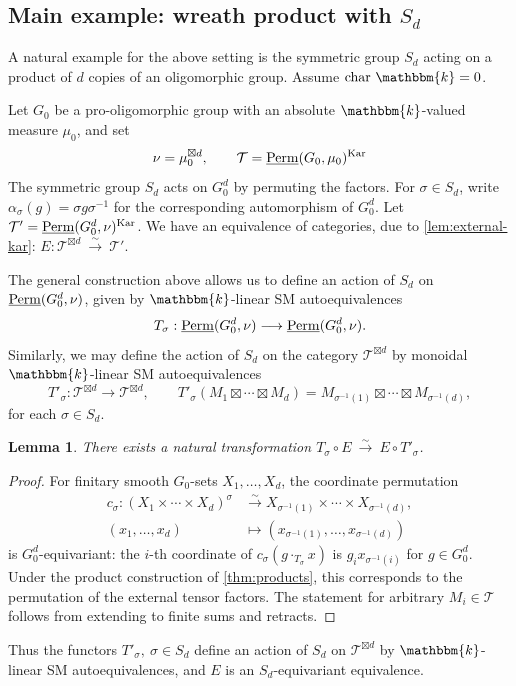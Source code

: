 \documentclass[11pt,a4paper]{amsart}
\theoremstyle{plain}%
\newtheorem{lemma}{Lemma}[subsection]
\theoremstyle{definition}
\theoremstyle{remark}
\newcommand{\Perm}{\underline{{\rm Perm}}}
\newcommand{\kk}{\mathbbm{k}}
\newcommand{\Kar}{\mathrm{Kar}}
\begin{document}
\subsection{Main example: wreath product with \texorpdfstring{$S_d$}{the symmetric group}}
    A natural example for the above setting is the symmetric group $S_d$ acting on a product of $d$ copies of an oligomorphic group. Assume $\mathrm{char} ~\kk=0$.
    
 Let $G_0$ be a pro-oligomorphic group with an absolute $\kk$-valued measure $\mu_0$, and set
\[
\nu=\mu_0^{\boxtimes d},\qquad \mathcal T =\Perm(G_0,\mu_0)^{\Kar}
\]
The symmetric group $S_d$ acts on $G_0^d$ by permuting the factors. For $\sigma\in S_d$, write $\alpha_\sigma(g)=\sigma g\sigma^{-1}$ for the corresponding automorphism of $G_0^d$.
 Let $\mathcal T'=\Perm(G_0^d,\nu)^{\Kar}$. We have an equivalence of categories, due to \cref{lem:external-kar}: $
E:\mathcal T^{\boxtimes d}~\xrightarrow{\sim} ~  \mathcal T'
$.

The general construction above allows us to define an action of $S_d$ on $\Perm(G_0^d,\nu)$, given by $\kk$-linear SM autoequivalences
\[
 T_\sigma:\Perm(G_0^d,\nu)\longrightarrow\Perm(G_0^d,\nu).
\] Similarly, we may define the action of $S_d$ on the category $\mathcal T^{\boxtimes d}$ by monoidal $\kk$-linear SM autoequivalences \[  T'_\sigma:\mathcal T^{\boxtimes d}\longrightarrow \mathcal T^{\boxtimes d}, \qquad
 T'_\sigma (M_1\boxtimes\cdots\boxtimes M_d)
 = M_{\sigma^{-1}(1)}\boxtimes\cdots\boxtimes M_{\sigma^{-1}(d)},
\]
for each $\sigma \in S_d$.





\begin{lemma}\label{lem:twisting}
There exists a natural transformation $T_\sigma\circ E~\xrightarrow{\sim} ~E\circ T'_{\sigma}$. 

\end{lemma}

\begin{proof}
 For finitary smooth $G_0$-sets $X_1,\ldots,X_d$, the coordinate permutation
\[
 \begin{aligned}
 c_\sigma:(X_1\times\cdots\times X_d)^{\sigma}
     &\xrightarrow{\sim}
       X_{\sigma^{-1}(1)}\times\cdots\times X_{\sigma^{-1}(d)},\\
 (x_1,\ldots,x_d)&\longmapsto
       (x_{\sigma^{-1}(1)},\ldots,x_{\sigma^{-1}(d)})
 \end{aligned}
\]
is $G_0^d$-equivariant: the $i$-th coordinate of
$c_\sigma(g\cdot_{T_\sigma}x)$ is $g_i x_{\sigma^{-1}(i)}$ for $g\in {G_0^d}$.
Under the product construction of \cref{thm:products}, this corresponds to the permutation of the external tensor factors. The statement for arbitrary $M_i\in\mathcal T$ follows from extending to finite sums and retracts.
    
\end{proof}
Thus the functors $T'_{\sigma}, ~\sigma\in S_d$ define an action of $S_d$ on {$\mathcal T^{\boxtimes d}$ by $\kk$-linear SM autoequivalences, and $E$ is an $S_d$-equivariant equivalence}.
\end{document}
